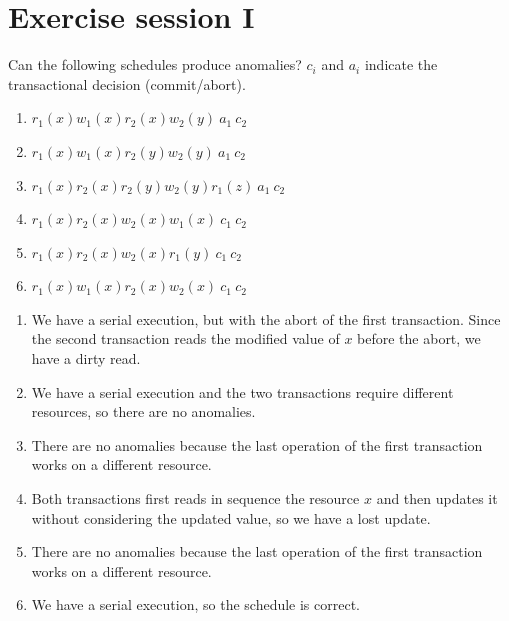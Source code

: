 \documentclass[12pt, a4paper]{report}
\newtheorem[style=M,bodystyle=\normalfont]{theorem}{Theorem}
\newtheorem[style=M,bodystyle=\normalfont]{corollary}{Corollary}
\newtheorem[style=M,bodystyle=\normalfont]{lemma}{Lemma}
\newtheorem[style=M,bodystyle=\normalfont]{definition}{Definition}
\begin{document}
\chapter{Exercise session I}
    \begin{Exercise}[label=1]
        Can the following schedules produce anomalies? $c_i$ and $a_i$ indicate the transactional decision (commit/abort). 
        \begin{enumerate}
            \item $r_1(x) w_1(x) r_2(x) w_2(y)\:a_1\:c_2$
            \item $r_1(x) w_1(x) r_2(y) w_2(y)\:a_1\:c_2$
            \item $r_1(x) r_2(x) r_2(y) w_2(y) r_1(z)\:a_1\:c_2$
            \item $r_1(x) r_2(x) w_2(x) w_1(x)\:c_1\:c_2$
            \item $r_1(x) r_2(x) w_2(x) r_1(y)\:c_1\:c_2$
            \item $r_1(x) w_1(x) r_2(x) w_2(x)\:c_1\:c_2$
        \end{enumerate}
    \end{Exercise}
    \begin{Answer}[ref=1]
        \begin{enumerate}
            \item We have a serial execution, but with the abort of the first transaction. Since the second transaction reads the modified value of $x$ before the abort, we have a
                dirty read. 
            \item We have a serial execution and the two transactions require different resources, so there are no anomalies.
            \item There are no anomalies because the last operation of the first transaction works on a different resource. 
            \item Both transactions first reads in sequence the resource $x$ and then updates it without considering the updated value, so we have a lost update. 
            \item There are no anomalies because the last operation of the first transaction works on a different resource. 
            \item We have a serial execution, so the schedule is correct. 
        \end{enumerate}
    \end{Answer}

    \newpage
    
\end{document}
